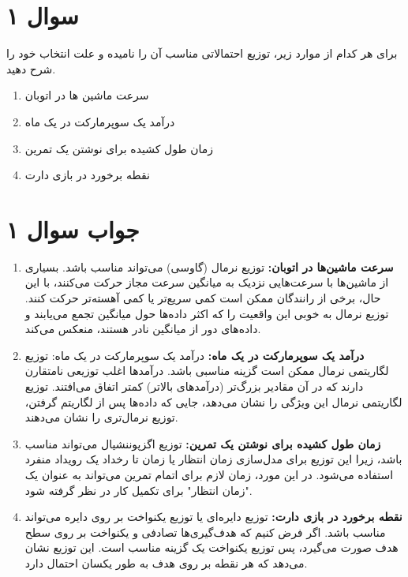 \section*{سوال ۱}

برای هر کدام از موارد زیر، توزیع احتمالاتی مناسب آن را نامیده و علت انتخاب خود را شرح دهید.

\begin{enumerate}
	\item سرعت ماشین ها در اتوبان
	\item درآمد یک سوپرمارکت در یک ماه
	\item زمان طول کشیده برای نوشتن یک تمرین
	\item نقطه برخورد در بازی دارت
\end{enumerate}

\section*{جواب سوال ۱}

\begin{enumerate}
	\item \textbf{سرعت ماشین‌ها در اتوبان:}
	توزیع نرمال (گاوسی) می‌تواند مناسب باشد. بسیاری از ماشین‌ها با سرعت‌هایی نزدیک به میانگین سرعت مجاز حرکت می‌کنند، با این حال، برخی از رانندگان ممکن است کمی سریع‌تر یا کمی آهسته‌تر حرکت کنند. توزیع نرمال به خوبی این واقعیت را که اکثر داده‌ها حول میانگین تجمع می‌یابند و داده‌های دور از میانگین نادر هستند، منعکس می‌کند.
	
	\item \textbf{درآمد یک سوپرمارکت در یک ماه:}
	درآمد یک سوپرمارکت در یک ماه: توزیع لگاریتمی نرمال ممکن است گزینه مناسبی باشد. درآمد‌ها اغلب توزیعی نامتقارن دارند که در آن مقادیر بزرگ‌تر (درآمدهای بالاتر) کمتر اتفاق می‌افتند. توزیع لگاریتمی نرمال این ویژگی را نشان می‌دهد، جایی که داده‌ها پس از لگاریتم گرفتن، توزیع نرمال‌تری را نشان می‌دهند.
	
	\item \textbf{زمان طول کشیده برای نوشتن یک تمرین:} 
	توزیع اگزپوننشیال می‌تواند مناسب باشد، زیرا این توزیع برای مدل‌سازی زمان انتظار یا زمان تا رخداد یک رویداد منفرد استفاده می‌شود. در این مورد، زمان لازم برای اتمام تمرین می‌تواند به عنوان یک "زمان انتظار" برای تکمیل کار در نظر گرفته شود.
	
	\item \textbf{نقطه برخورد در بازی دارت:} 
	توزیع دایره‌ای یا توزیع یکنواخت بر روی دایره می‌تواند مناسب باشد. اگر فرض کنیم که هدف‌گیری‌ها تصادفی و یکنواخت بر روی سطح هدف صورت می‌گیرد، پس توزیع یکنواخت یک گزینه مناسب است. این توزیع نشان می‌دهد که هر نقطه بر روی هدف به طور یکسان احتمال دارد.
	
\end{enumerate}
